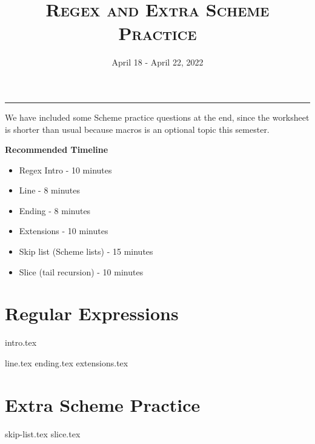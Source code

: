 \documentclass{exam}
\title{\textsc{Regex and Extra Scheme Practice}}
\date{April 18 - April 22, 2022}
\begin{document}
\maketitle
\rule{\textwidth}{0.15em}
\fontsize{12}{15}\selectfont

\begin{guide}
\begin{blocksection}
    We have included some Scheme practice questions at the end, since the worksheet
    is shorter than usual because macros is an optional topic this semester.

    \textbf{Recommended Timeline}
    \begin{itemize}
        \item Regex Intro - 10 minutes
        \item Line - 8 minutes
        \item Ending - 8 minutes
        \item Extensions - 10 minutes
        \item Skip list (Scheme lists) - 15 minutes
        \item Slice (tail recursion) - 10 minutes
    \end{itemize}
\end{blocksection}
\newpage
\end{guide}

\section{Regular Expressions}
{intro.tex}
\newpage
\begin{questions}
{line.tex}
{ending.tex}
{extensions.tex}
\end{questions}

\newpage
\section{Extra Scheme Practice}
\begin{questions}
{skip-list.tex}
{slice.tex}
\end{questions}


\end{document}
